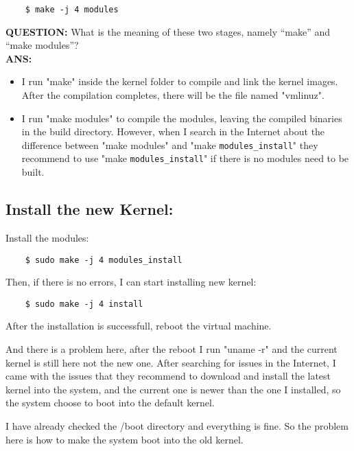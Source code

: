\documentclass[a4paper, 11pt]{article}
\begin{document}
\begin{verbatim}
    $ make -j 4 modules
\end{verbatim}

\textbf{QUESTION:} What is the meaning of these two stages, namely “make” and “make modules”? \\
\textbf{ANS:} 
\begin{itemize}
    \item I run "make" inside the kernel folder to compile and link the kernel images. After the compilation completes, there will be the file named "vmlinuz".
    \item I run "make modules" to compile the modules, leaving the compiled binaries in the build directory. However, when I search in the Internet about the difference between "make modules" and "make \texttt{modules\_install}" they recommend to use "make \texttt{modules\_install}" if there is no modules need to be built. 
\end{itemize}

\subsection{Install the new Kernel:}

\par{Install the modules:}

\begin{verbatim}
    $ sudo make -j 4 modules_install
\end{verbatim}

\par{Then, if there is no errors, I can start installing new kernel:}

\begin{verbatim}
    $ sudo make -j 4 install
\end{verbatim}

\par{After the installation is successfull, reboot the virtual machine.}
\par{And there is a problem here, after the reboot I run "uname -r" and the current kernel is still here not the new one. After searching for issues in the Internet, I came with the issues that they recommend to download and install the latest kernel into the system, and the current one is newer than the one I installed, so the system choose to boot into the default kernel.}

\par{I have already checked the /boot directory and everything is fine. So the problem here is how to make the system boot into the old kernel.}
\end{document}
